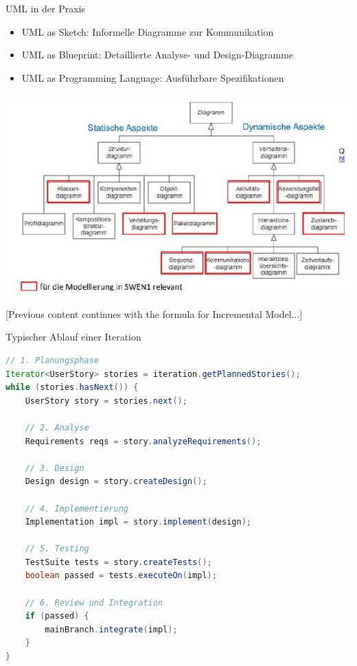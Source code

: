 \begin{concept}{UML in der Praxis}
\begin{itemize}
    \item UML as Sketch: Informelle Diagramme zur Kommunikation
    \item UML as Blueprint: Detaillierte Analyse- und Design-Diagramme
    \item UML as Programming Language: Ausführbare Spezifikationen
\end{itemize}
\includegraphics[width=\linewidth]{images/2024_12_29_0d1d7b5551ea1b4b41bdg-01(1)}
\end{concept}

[Previous content continues with the formula for Incremental Model...]

\begin{examplecode}{Typischer Ablauf einer Iteration}
\begin{lstlisting}[language=Java]
// 1. Planungsphase
Iterator<UserStory> stories = iteration.getPlannedStories();
while (stories.hasNext()) {
    UserStory story = stories.next();
    
    // 2. Analyse
    Requirements reqs = story.analyzeRequirements();
    
    // 3. Design
    Design design = story.createDesign();
    
    // 4. Implementierung
    Implementation impl = story.implement(design);
    
    // 5. Testing
    TestSuite tests = story.createTests();
    boolean passed = tests.executeOn(impl);
    
    // 6. Review und Integration
    if (passed) {
        mainBranch.integrate(impl);
    }
}
\end{lstlisting}
\end{examplecode}

